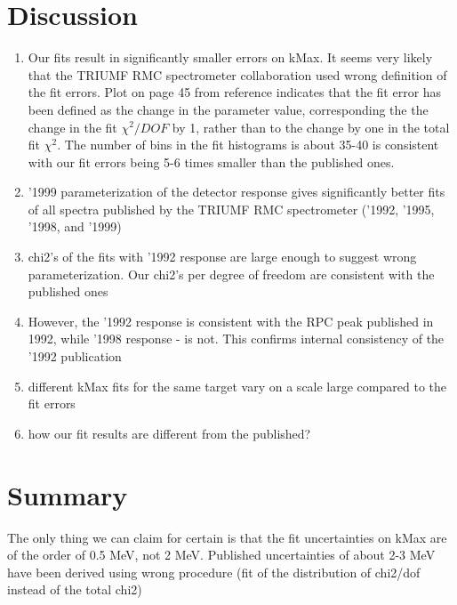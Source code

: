 \documentclass[12pt]{article}
\begin{document}



\section { Discussion }

\begin{enumerate}
\item
  Our fits result in significantly smaller errors on kMax. It seems very likely
  that the TRIUMF RMC spectrometer collaboration used wrong definition of the
  fit errors. Plot on page 45 from reference \cite{BERGBISH_MS_THESIS} indicates
  that the fit error has been defined as the change in the parameter value,
  corresponding the the change in the fit $\chi^2/DOF$ by 1, rather than to the change
  by one in the total fit $\chi^2$. The number of bins in the fit histograms
  is about 35-40 is consistent with our fit errors being 5-6 times smaller than
  the published ones.
\item
  '1999 parameterization of the detector response gives significantly better
  fits of all spectra published by the TRIUMF RMC spectrometer 
  ('1992, '1995, '1998, and '1999)
\item
  chi2's of the fits with '1992 response are large enough to suggest wrong
  parameterization. Our chi2's per degree of freedom are consistent with
  the published ones
\item
  However, the '1992 response is consistent with the RPC peak published
  in 1992, while '1998 response - is not. This confirms internal consistency
  of the '1992 publication 
\item
  different kMax fits for the same target vary on a scale large compared
  to the fit errors
\item
  how our fit results are different from the published? 
\end{enumerate}

\section{ Summary }


The only thing we can claim for certain is that the fit uncertainties on kMax are
of the order of 0.5 MeV, not 2 MeV. Published uncertainties of about 2-3 MeV
have been derived using wrong procedure (fit of the distribution of chi2/dof
instead of the total chi2)
\end{document}
